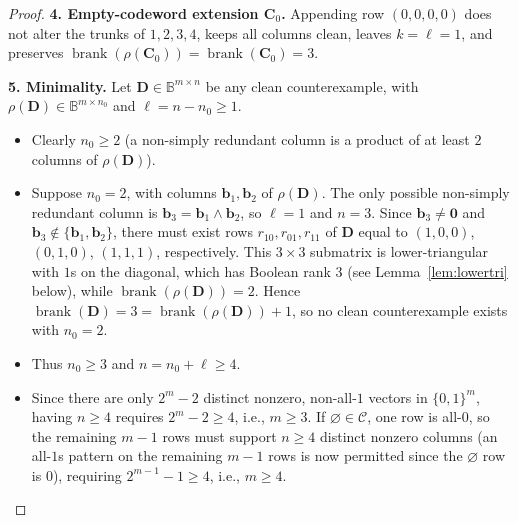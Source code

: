 \documentclass[11pt]{article}
\theoremstyle{plain}
\theoremstyle{definition}
\theoremstyle{remark}
\DeclareMathOperator{\brank}{brank}
\begin{document}
\begin{proof}
\medskip
\noindent\textbf{4. Empty-codeword extension $\mathbf{C}_0$.}
Appending row $(0,0,0,0)$ does not alter the trunks of $1,2,3,4$, keeps all columns clean, leaves $k = \ell = 1$, and preserves $\brank(\rho(\mathbf{C}_0)) = \brank(\mathbf{C}_0) = 3$.

\medskip
\noindent\textbf{5. Minimality.}
Let $\mathbf{D} \in \mathbb{B}^{m \times n}$ be any clean counterexample, with $\rho(\mathbf{D}) \in \mathbb{B}^{m \times n_0}$ and $\ell = n - n_0 \ge 1$.
\begin{itemize}[leftmargin=2em]
\item Clearly $n_0 \ge 2$ (a non-simply redundant column is a product of at least $2$ columns of $\rho(\mathbf{D})$).
\item Suppose $n_0 = 2$, with columns $\mathbf{b}_1, \mathbf{b}_2$ of $\rho(\mathbf{D})$. The only possible non-simply redundant column is $\mathbf{b}_3 = \mathbf{b}_1 \wedge \mathbf{b}_2$, so $\ell = 1$ and $n = 3$. Since $\mathbf{b}_3 \neq \mathbf{0}$ and $\mathbf{b}_3 \notin \{\mathbf{b}_1, \mathbf{b}_2\}$, there must exist rows $r_{10}, r_{01}, r_{11}$ of $\mathbf{D}$ equal to $(1,0,0)$, $(0,1,0)$, $(1,1,1)$, respectively. This $3 \times 3$ submatrix is lower-triangular with $1$s on the diagonal, which has Boolean rank $3$ (see Lemma~\ref{lem:lowertri} below), while $\brank(\rho(\mathbf{D})) = 2$. Hence $\brank(\mathbf{D}) = 3 = \brank(\rho(\mathbf{D})) + 1$, so no clean counterexample exists with $n_0 = 2$.
\item Thus $n_0 \ge 3$ and $n = n_0 + \ell \ge 4$.
\item Since there are only $2^m - 2$ distinct nonzero, non-all-$1$ vectors in $\{0,1\}^m$, having $n \ge 4$ requires $2^m - 2 \ge 4$, i.e., $m \ge 3$. If $\varnothing \in \mathcal{C}$, one row is all-$0$, so the remaining $m - 1$ rows must support $n \ge 4$ distinct nonzero columns (an all-$1$s pattern on the remaining $m-1$ rows is now permitted since the $\varnothing$ row is $0$), requiring $2^{m-1} - 1 \ge 4$, i.e., $m \ge 4$. \qedhere
\end{itemize}
\end{proof}
\end{document}
